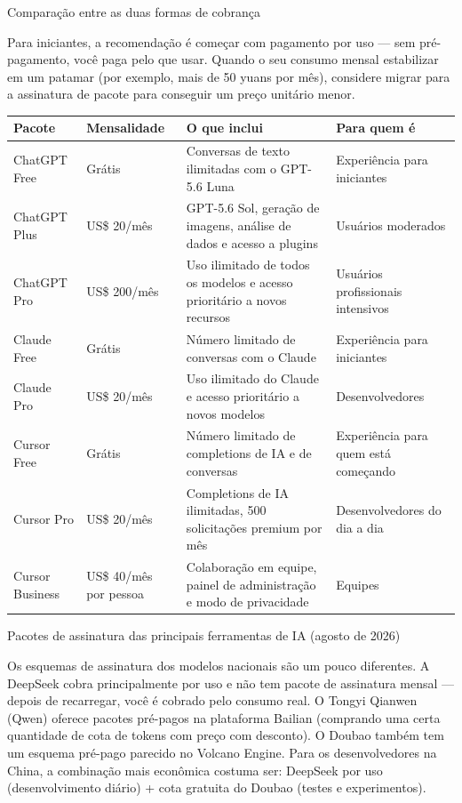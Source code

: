 \begin{center}\small\color{gray}Comparação entre as duas formas de cobrança\end{center}

Para iniciantes, a recomendação é começar com pagamento por uso — sem pré-pagamento, você paga pelo que usar. Quando o seu consumo mensal estabilizar em um patamar (por exemplo, mais de 50 yuans por mês), considere migrar para a assinatura de pacote para conseguir um preço unitário menor.


\begin{center}
\begin{tabularx}{\linewidth}{|X|X|X|X|}
\hline
\textbf{Pacote} & \textbf{Mensalidade} & \textbf{O que inclui} & \textbf{Para quem é} \tabularnewline
\hline
ChatGPT Free & Grátis & Conversas de texto ilimitadas com o GPT-5.6 Luna & Experiência para iniciantes \tabularnewline
ChatGPT Plus & US\$ 20/mês & GPT-5.6 Sol, geração de imagens, análise de dados e acesso a plugins & Usuários moderados \tabularnewline
ChatGPT Pro & US\$ 200/mês & Uso ilimitado de todos os modelos e acesso prioritário a novos recursos & Usuários profissionais intensivos \tabularnewline
Claude Free & Grátis & Número limitado de conversas com o Claude & Experiência para iniciantes \tabularnewline
Claude Pro & US\$ 20/mês & Uso ilimitado do Claude e acesso prioritário a novos modelos & Desenvolvedores \tabularnewline
Cursor Free & Grátis & Número limitado de completions de IA e de conversas & Experiência para quem está começando \tabularnewline
Cursor Pro & US\$ 20/mês & Completions de IA ilimitadas, 500 solicitações premium por mês & Desenvolvedores do dia a dia \tabularnewline
Cursor Business & US\$ 40/mês por pessoa & Colaboração em equipe, painel de administração e modo de privacidade & Equipes \tabularnewline
\hline
\end{tabularx}
\end{center}

\begin{center}\small\color{gray}Pacotes de assinatura das principais ferramentas de IA (agosto de 2026)\end{center}

Os esquemas de assinatura dos modelos nacionais são um pouco diferentes. A DeepSeek cobra principalmente por uso e não tem pacote de assinatura mensal — depois de recarregar, você é cobrado pelo consumo real. O Tongyi Qianwen (Qwen) oferece pacotes pré-pagos na plataforma Bailian (comprando uma certa quantidade de cota de tokens com preço com desconto). O Doubao também tem um esquema pré-pago parecido no Volcano Engine. Para os desenvolvedores na China, a combinação mais econômica costuma ser: DeepSeek por uso (desenvolvimento diário) + cota gratuita do Doubao (testes e experimentos).


